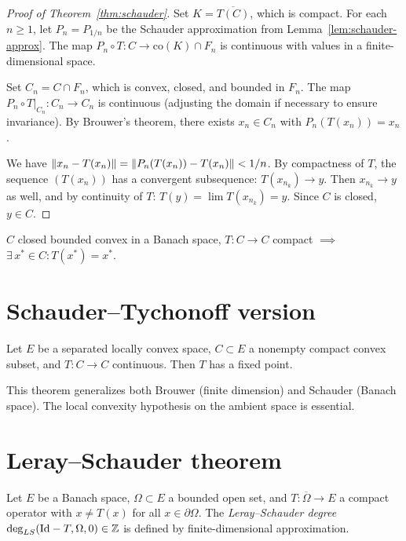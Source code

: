 \begin{proof}[Proof of Theorem~\ref{thm:schauder}]
Set $K = \overline{T(C)}$, which is compact. For each $n \geq 1$, let
$P_n = P_{1/n}$ be the Schauder approximation from Lemma~\ref{lem:schauder-approx}.
The map $P_n \circ T : C \to \mathrm{co}(K) \cap F_n$ is continuous with values
in a finite-dimensional space.

Set $C_n = C \cap F_n$, which is convex, closed, and bounded in $F_n$. The map
$P_n \circ T|_{C_n} : C_n \to C_n$ is continuous (adjusting the domain if
necessary to ensure invariance). By Brouwer's theorem, there exists
$x_n \in C_n$ with $P_n(T(x_n)) = x_n$.

We have $\left\| x_n - T(x_n) \right\| = \left\| P_n(T(x_n)) - T(x_n) \right\| < 1/n$. By
compactness of $T$, the sequence $(T(x_n))$ has a convergent subsequence:
$T(x_{n_k}) \to y$. Then $x_{n_k} \to y$ as well, and by continuity of $T$:
$T(y) = \lim T(x_{n_k}) = y$. Since $C$ is closed, $y \in C$.
\end{proof}

\begin{keyformulas}[title=\textbf{Schauder's theorem}]
$C$ closed bounded convex in a Banach space, $T : C \to C$ compact $\implies$
$\exists\, x^* \in C : T(x^*) = x^*$.
\end{keyformulas}

\section{Schauder--Tychonoff version}

\begin{theorem}
Let $E$ be a separated locally convex space, $C \subset E$ a nonempty compact
convex subset, and $T : C \to C$ continuous. Then $T$ has a fixed point.
\end{theorem}

\begin{remark}
This theorem generalizes both Brouwer (finite dimension) and Schauder (Banach
space). The local convexity hypothesis on the ambient space is essential.
\end{remark}

\section{Leray--Schauder theorem}

\begin{definition}
Let $E$ be a Banach space, $\Omega \subset E$ a bounded open set, and
$T : \overline{\Omega} \to E$ a compact operator with $x \neq T(x)$ for all
$x \in \partial\Omega$. The \emph{Leray--Schauder degree}
$\deg_{LS}(\mathrm{Id} - T, \Omega, 0) \in \mathbb{Z}$ is defined by
finite-dimensional approximation.
\end{definition}


